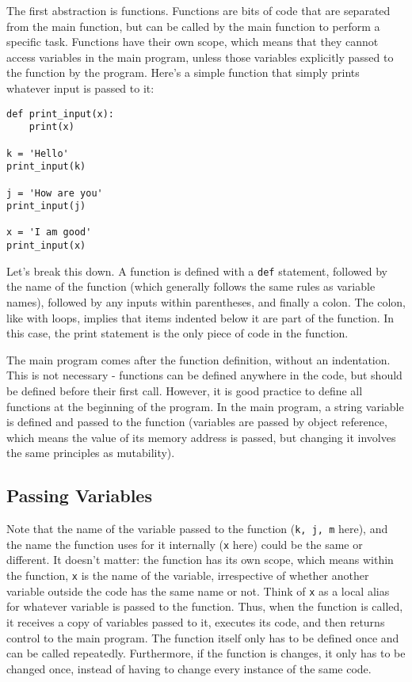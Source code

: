\documentclass[12pt]{article}
\newcommand{\code}{\texttt}
\begin{document}
The first abstraction is functions. Functions are bits of code that are separated from the main function, but can be called by the main function to perform a specific task. Functions have their own scope, which means that they cannot access variables in the main program, unless those variables explicitly passed to the function by the program. Here's a simple function that simply prints whatever input is passed to it:

\begin{lstlisting}[frame=single] 
def print_input(x):
    print(x)

k = 'Hello'
print_input(k)

j = 'How are you'
print_input(j)

x = 'I am good'
print_input(x)
\end{lstlisting}

Let's break this down. A function is defined with a \code{def} statement, followed by the name of the function (which generally follows the same rules as variable names), followed by any inputs within parentheses, and finally a colon. The colon, like with loops, implies that items indented below it are part of the function. In this case, the print statement is the only piece of code in the function. 

The main program comes after the function definition, without an indentation. This is not necessary - functions can be defined anywhere in the code, but should be defined before their first call. However, it is good practice to define all functions at the beginning of the program. In the main program, a string variable is defined and passed to the function (variables are passed by object reference, which means the value of its memory address is passed, but changing it involves the same principles as mutability).

\subsection{Passing Variables} 

Note that the name of the variable passed to the function (\code{k, j, m} here), and the name the function uses for it internally (\code{x} here) could be the same or different. It doesn't matter: the function has its own scope, which means within the function, \code{x} is the name of the variable, irrespective of whether another variable outside the code has the same name or not. Think of \code{x} as a local alias for whatever variable is passed to the function. Thus, when the function is called, it receives a copy of variables passed to it, executes its code, and then returns control to the main program. The function itself only has to be defined once and can be called repeatedly. Furthermore, if the function is changes, it only has to be changed once, instead of having to change every instance of the same code.
\end{document}
